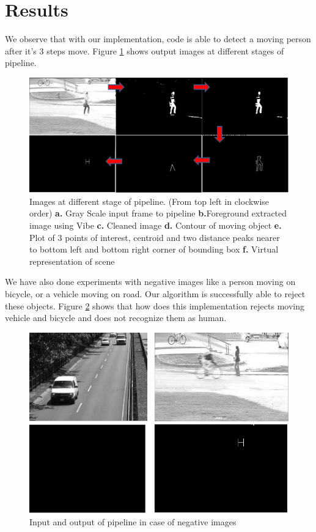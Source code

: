 \documentclass[conference]{IEEEtran}
\begin{document}
\section{Results}
We observe that with our implementation, code is able to detect a moving
person after it's 3 steps move. Figure  \ref{pipeline_images} shows
output images at different stages of pipeline.

\begin{figure}[!h]
\centering
\includegraphics[scale=0.30]{figures/pipeline_images}
\caption{Images at different stage of pipeline. (From top left in
clockwise order) \textbf{a.} Gray Scale input frame to pipeline
\textbf{b.}Foreground extracted image using Vibe \textbf{c.} Cleaned
image \textbf{d.} Contour of moving object \textbf{e.} Plot of 3 points
of interest, centroid and two distance peaks nearer to bottom left and
bottom right corner of bounding box \textbf{f.} Virtual representation
of scene} 
\label{pipeline_images}
\end{figure}

We have also done experiments with negative images like a person moving
on bicycle, or a vehicle moving on road. Our algorithm is successfully
able to reject these objects. Figure \ref{negative_inputs} shows that
how does this implementation rejects moving vehicle and bicycle and  does
not recognize them as human.
\begin{figure}[!h]
\centering
\includegraphics[scale=0.30]{figures/negative_inputs}
\caption{Input and output of pipeline in case of negative images}
\label{negative_inputs}
\end{figure}
\end{document}
